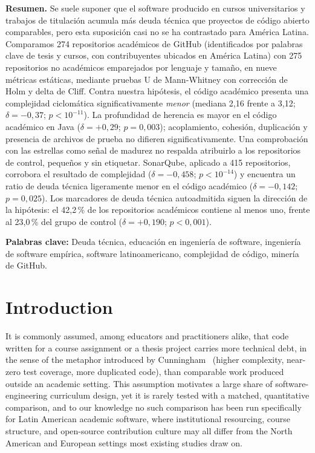 \documentclass{cleiej}
\providecommand{\citep}[1]{\cite{#1}}
\begin{document}
\vspace{1em}
\noindent\textbf{Resumen.} Se suele suponer que el software producido en cursos universitarios y trabajos de titulación acumula más deuda técnica que proyectos de código abierto comparables, pero esta suposición casi no se ha contrastado para América Latina. Comparamos 274 repositorios académicos de GitHub (identificados por palabras clave de tesis y cursos, con contribuyentes ubicados en América Latina) con 275 repositorios no académicos emparejados por lenguaje y tamaño, en nueve métricas estáticas, mediante pruebas U de Mann-Whitney con corrección de Holm y delta de Cliff. Contra nuestra hipótesis, el código académico presenta una complejidad ciclomática significativamente \emph{menor} (mediana 2,16 frente a 3,12; $\delta=-0{,}37$; $p<10^{-11}$). La profundidad de herencia es mayor en el código académico en Java ($\delta=+0{,}29$; $p=0{,}003$); acoplamiento, cohesión, duplicación y presencia de archivos de prueba no difieren significativamente. Una comprobación con las estrellas como señal de madurez no respalda atribuirlo a los repositorios de control, pequeños y sin etiquetar. SonarQube, aplicado a 415 repositorios, corrobora el resultado de complejidad ($\delta=-0{,}458$; $p<10^{-14}$) y encuentra un ratio de deuda técnica ligeramente menor en el código académico ($\delta=-0{,}142$; $p=0{,}025$). Los marcadores de deuda técnica autoadmitida siguen la dirección de la hipótesis: el 42,2\,\% de los repositorios académicos contiene al menos uno, frente al 23,0\,\% del grupo de control ($\delta=+0{,}190$; $p<0{,}001$).

\vspace{0.5em}
\noindent\textbf{Palabras clave:} Deuda técnica, educación en ingeniería de software, ingeniería de software empírica, software latinoamericano, complejidad de código, minería de GitHub.

\section{Introduction}

It is commonly assumed, among educators and practitioners alike, that code written for a course assignment or a thesis project carries more technical debt, in the sense of the metaphor introduced by Cunningham~\citep{cunningham1992wycash} (higher complexity, near-zero test coverage, more duplicated code), than comparable work produced outside an academic setting. This assumption motivates a large share of software-engineering curriculum design, yet it is rarely tested with a matched, quantitative comparison, and to our knowledge no such comparison has been run specifically for Latin American academic software, where institutional resourcing, course structure, and open-source contribution culture may all differ from the North American and European settings most existing studies draw on.
\end{document}
